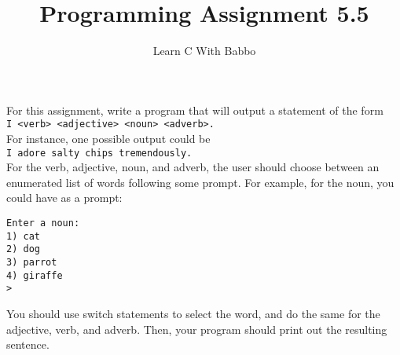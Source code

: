 \documentclass{article}
\begin{document}
\title{Programming Assignment 5.5}
\author{Learn C With Babbo}
\date{}
\maketitle

For this assignment, write a program that will output a statement of the form \\

\verb|I <verb> <adjective> <noun> <adverb>.| \\

For instance, one possible output could be \\

\verb|I adore salty chips tremendously.| \\

For the verb, adjective, noun, and adverb, the user should choose between an enumerated list of words following some
prompt. For example, for the noun, you could have as a prompt:

\begin{verbatim}
Enter a noun: 
1) cat
2) dog
3) parrot
4) giraffe
> 
\end{verbatim}

You should use switch statements to select the word, and do the same for the adjective, verb, and adverb. Then, your
program should print out the resulting sentence.
\end{document}
